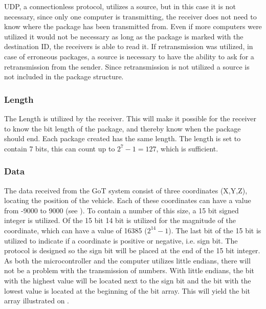 UDP, a connectionless protocol, utilizes a source, but in this case it is not necessary, since only one computer is transmitting, the receiver does not need to know where the package has been transmitted from. Even if more computers were utilized it would not be necessary as long as the package is marked with the destination ID, the receivers is able to read it. If retransmission was utilized, in case of erroneous packages, a source is necessary to have the ability to ask for a retransmission from the sender. Since retransmission is not utilized a source is not included in the package structure.

\subsubsection{Length}
The Length is utilized by the receiver. This will make it possible for the receiver to know the bit length of the package, and thereby know when the package should end. Each package created has the same length. The length is set to contain 7 bits, this can count up to $2^{7}-1 = 127$, which is sufficient.

\subsubsection{Data}
The data received from the GoT system consist of three coordinates (X,Y,Z), locating the position of the vehicle. Each of these coordinates can have a value from -9000 to 9000 (see ). To contain a number of this size, a 15 bit signed integer is utilized. Of the 15 bit 14 bit is utilized for the magnitude of the coordinate, which can have a value of 16385 ($2^{14}-1$). The last bit of the 15 bit is utilized to indicate if a coordinate is positive or negative, i.e. sign bit. The protocol is designed so the sign bit will be placed at the end of the 15 bit integer. As both the microcontroller and the computer utilizes little endians, there will not be a problem with the transmission of numbers. With little endians, the bit with the highest value will be located next to the sign bit and the bit with the lowest value is located at the beginning of the bit array. This will yield the bit array illustrated on .

